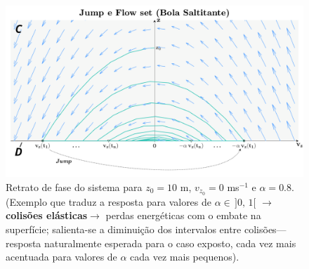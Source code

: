 
\vspace{-0.65em}
\begin{figure}[H]
    \centering
    \includegraphics[width = 0.9\linewidth]{img/P1/P1-PhasePortrait.png}
    \caption{Retrato de fase do sistema para $z_0 = 10$ m, $v_{z_0} = 0$ ms$^{-1}$ e $\alpha = 0.8$. (Exemplo que traduz a resposta para valores de $\alpha \in\, ]0,\, 1[$ $\rightarrow$ \textbf{colisões elásticas}\protect\footnotemark[9] $\rightarrow$ perdas energéticas com o embate na superfície; salienta-se a diminuição dos intervalos entre colisões---resposta naturalmente esperada para o caso exposto, cada vez mais acentuada para valores de $\alpha$ cada vez mais pequenos).}
    \label{fig:phase-portrait}
\end{figure}


